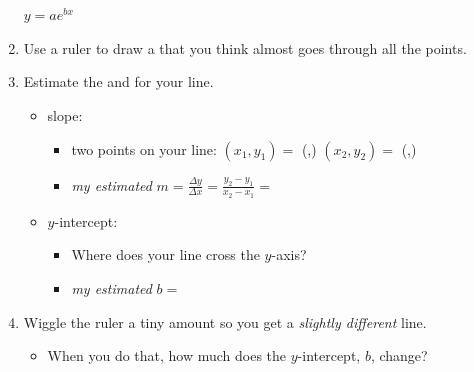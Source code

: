 \documentclass[12pt,letterpaper]{memoir}
\begin{document}
\begin{enumerate}[fullwidth,label={\Large$\bm{\square}$}\,\arabic*.,resume]
\begin{tcbraster}[
            raster equal height, raster columns = 3,
            raster left skip = 0.3in, raster right skip = 0.3in, raster column skip = 0.2in,
            colback=white, valign=center,
        ]
\begin{tcolorbox}
\\
                \\
                $y = ae^{bx}$
            \end{tcolorbox}
        \end{tcbraster}
    \item Use a ruler to draw a  that you think almost goes through all the points.
    \item Estimate the  and  for your line.
        \begin{itemize}
            \item slope:
                \begin{itemize}
                    \item two points on your line: 
                        $(x_1,y_1) = $ (\underline{\hspace{4em}},\underline{\hspace{4em}})
                        $(x_2,y_2) = $ (\underline{\hspace{4em}},\underline{\hspace{4em}})
                    \item {\itshape my estimated} 
                        $m = \frac{\Delta y}{\Delta x} = \frac{y_2 - y_1}{x_2 - x_1} =$ 
                        \underline{\hspace{3in}}
                \end{itemize}
            \item $y$-intercept:
                \begin{itemize}
                    \item Where does your line cross the $y$-axis?
                    \item {\itshape my estimated} $b =$ \underline{\hspace{1in}}
                \end{itemize}
        \end{itemize}
    \item Wiggle the ruler a tiny amount so you get a {\itshape slightly different} line.
        \begin{itemize}
            \item When you do that, how much does the $y$-intercept, $b$, change?

\end{itemize}
\end{enumerate}
\end{document}
